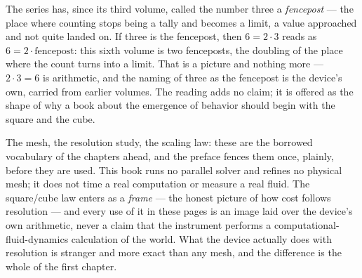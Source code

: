 \begin{intuition}
The series has, since its third volume, called the number three a
\emph{fencepost} --- the place where counting stops being a tally and becomes a
limit, a value approached and not quite landed on. If three is the fencepost,
then $6 = 2 \cdot 3$ reads as $6 = 2 \cdot \text{fencepost}$: this sixth volume
is two fenceposts, the doubling of the place where the count turns into a limit.
That is a picture and nothing more --- $2 \cdot 3 = 6$ is arithmetic, and the
naming of three as the fencepost is the device's own, carried from earlier
volumes. The reading adds no claim; it is offered as the shape of why a book
about the emergence of behavior should begin with the square and the cube.
\end{intuition}

The mesh, the resolution study, the scaling law: these are the borrowed
vocabulary of the chapters ahead, and the preface fences them once, plainly,
before they are used. This book runs no parallel solver and refines no physical
mesh; it does not time a real computation or measure a real fluid. The
square/cube law enters as a \emph{frame} --- the honest picture of how cost
follows resolution --- and every use of it in these pages is an image laid over
the device's own arithmetic, never a claim that the instrument performs a
computational-fluid-dynamics calculation of the world. What the device actually
does with resolution is stranger and more exact than any mesh, and the
difference is the whole of the first chapter.

